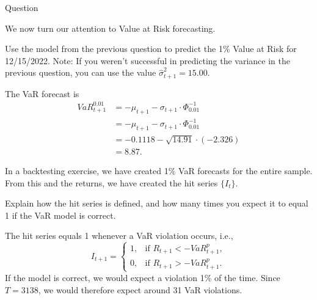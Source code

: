 \documentclass[12pt, a4paper]{article}
\begin{document}
\begin{exam}{Question \thequestion}
\begin{instructions}
We now turn our attention to Value at Risk forecasting.
\end{instructions}
\begin{problem}[6]
Use the model from the previous question to predict the 1\% Value at Risk for 12/15/2022. Note: If you weren't successful in predicting the variance in the previous question, you can use the value $\widehat{\sigma}^2_{t+1}=15.00$.
\begin{solution}[8cm]
The VaR forecast is
\begin{align*}
VaR^{0.01}_{t+1} &= -\mu_{t+1} - \sigma_{t+1} \cdot{} \Phi_{0.01}^{-1}\\
&= -\mu_{t+1} - \sigma_{t+1} \cdot \Phi_{0.01}^{-1}\\
&=-0.1118- \sqrt{14.91}\cdot(-2.326)\\
&=8.87.
\end{align*}
\end{solution}
\end{problem}
\begin{problem*}[\auto]
In a backtesting exercise, we have created 1\% VaR forecasts for the entire sample. From this and the returns, we have created the hit series $\{I_t\}$.
\begin{parts}
\item{} Explain how the hit series is defined, and how many times you expect it to equal 1 if the VaR model is correct.
\begin{solution}[10cm]
The hit series equals 1 whenever a VaR violation occurs, i.e.,
\begin{equation*}
I_{t+1}=\left\{
\begin{array}{cc}
1, & \text{if }R_{t+1}<-VaR_{t+1}^{p}, \\
0, & \text{if }R_{t+1}>-VaR_{t+1}^{p}.%
\end{array}%
\right.
\end{equation*}
If the model is correct, we would expect a violation 1\% of the time. Since $T=3138$, we would therefore expect around 31 VaR violations.
\end{solution}


\end{parts}
\end{problem*}
\end{exam}
\end{document}

